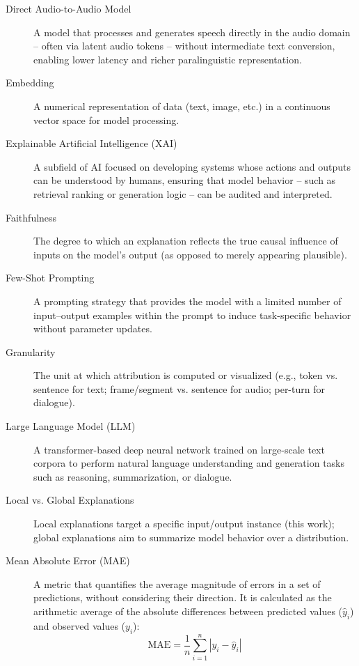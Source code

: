 \begin{description}
    \item[Direct Audio-to-Audio Model] A model that processes and generates speech directly in the audio domain -- often via latent audio tokens -- without intermediate text conversion, enabling lower latency and richer paralinguistic representation.

    \item[Embedding] A numerical representation of data (text, image, etc.) in a continuous vector space for model processing.

    \item[Explainable Artificial Intelligence (XAI)] A subfield of AI focused on developing systems whose actions and outputs can be understood by humans, ensuring that model behavior -- such as retrieval ranking or generation logic -- can be audited and interpreted.

    \item[Faithfulness] The degree to which an explanation reflects the true causal influence of inputs on the model’s output (as opposed to merely appearing plausible).

    \item[Few-Shot Prompting] A prompting strategy that provides the model with a limited number of input–output examples within the prompt to induce task-specific behavior without parameter updates.

    \item[Granularity] The unit at which attribution is computed or visualized (e.g., token vs. sentence for text; frame/segment vs. sentence for audio; per-turn for dialogue).

    \item[Large Language Model (LLM)] A transformer-based deep neural network trained on large-scale text corpora to perform natural language understanding and generation tasks such as reasoning, summarization, or dialogue.

    \item[Local vs. Global Explanations] Local explanations target a specific input/output instance (this work); global explanations aim to summarize model behavior over a distribution.

    \item[Mean Absolute Error (MAE)] A metric that quantifies the average magnitude of errors in a set of predictions, without considering their direction. It is calculated as the arithmetic average of the absolute differences between predicted values ($\hat{y}_i$) and observed values ($y_i$):
    \[
    \text{MAE} = \frac{1}{n} \sum_{i=1}^{n} |y_i - \hat{y}_i|
    \]


\end{description}
